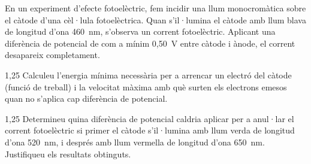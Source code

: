 En un experiment d'efecte fotoelèctric, fem incidir una llum monocromàtica sobre el càtode d'una cèl·lula fotoelèctrica. Quan s'il·lumina el càtode amb llum blava de longitud d'ona 460~nm, s'observa un corrent fotoelèctric. Aplicant una diferència de potencial de com a mínim 0,50~V entre càtode i ànode, el corrent desapareix completament.

\begin{apartat}{1,25}
Calculeu l'energia mínima necessària per a arrencar un electró del càtode (funció de treball) i la velocitat màxima amb què surten els electrons emesos quan no s'aplica cap diferència de potencial.
\end{apartat}

\begin{apartat}{1,25}
Determineu quina diferència de potencial caldria aplicar per a anul·lar el corrent fotoelèctric si primer el càtode s'il·lumina amb llum verda de longitud d'ona 520~nm, i després amb llum vermella de longitud d'ona 650~nm. Justifiqueu els resultats obtinguts.
\end{apartat}


